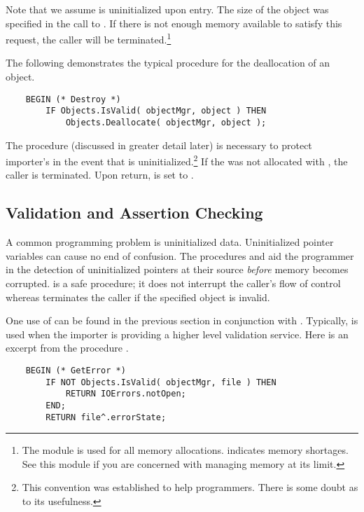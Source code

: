 Note that we assume  is uninitialized upon entry.  
The size of the object was specified in the call to .
If there is not enough memory available to satisfy this request, 
the caller will be terminated.\footnote{
    The module  is used for all memory allocations.
     indicates memory shortages.  See this
    module if you are concerned with managing memory at its limit.
    }

The following demonstrates the typical procedure for the deallocation
of an object.

\begin{verbatim}
    BEGIN (* Destroy *)
        IF Objects.IsValid( objectMgr, object ) THEN
            Objects.Deallocate( objectMgr, object );
\end{verbatim}

The procedure  (discussed in greater detail later)
is necessary to protect importer's in the event that 
is uninitialized.\footnote{
    This convention was established to help programmers.  There is
    some doubt as to its usefulness.
    }
If the  was not allocated with , the
caller is terminated.  Upon return,  is set to .

\subsection{Validation and Assertion Checking}

A common programming problem is uninitialized data.  Uninitialized
pointer variables can cause no end of confusion.  The procedures
 and  aid the programmer in the detection
of uninitialized pointers at their source {\em before} memory 
becomes corrupted.   is a safe procedure; it
does not interrupt the caller's flow of control whereas 
terminates the caller if the specified object is invalid.


One use of  can be found in the previous section
in conjunction with .  Typically, 
is used when the importer is providing a higher level validation
service.  Here is an excerpt from the procedure .

\begin{verbatim}
    BEGIN (* GetError *)
        IF NOT Objects.IsValid( objectMgr, file ) THEN
            RETURN IOErrors.notOpen;
        END;
        RETURN file^.errorState;
\end{verbatim}

